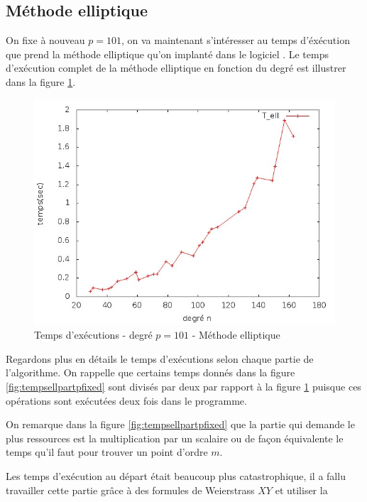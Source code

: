\documentclass[a4paper]{article} %
\numberwithin{section}{part}
\numberwithin{equation}{section}
\begin{document}
\subsection{Méthode elliptique}
On fixe à nouveau $p = 101$, on va maintenant s'intéresser au temps d'éxécution
que prend la méthode elliptique qu'on implanté dans le logiciel .
Le temps d'exécution complet de la méthode elliptique en fonction du degré est
illustrer dans la figure \ref{fig:tempsellfullpfixed}.\par
\begin{figure}[H]
\begin{center}
\includegraphics[scale=0.6]{data_test17_testell2}
\caption{Temps d'exécutions - degré $p = 101$ - Méthode elliptique}
\label{fig:tempsellfullpfixed}
\end{center}
\end{figure}
Regardons plus en détails le temps d'exécutions selon chaque partie de
l'algorithme. On rappelle que certains temps donnés dans la figure
\ref{fig:tempsellpartpfixed} sont divisés par deux par rapport à la figure 
\ref{fig:tempsellfullpfixed} puisque ces opérations sont exécutées deux fois
dans le programme.\par
On remarque dans la figure \ref{fig:tempsellpartpfixed} que la partie qui 
demande le plus ressources est la multiplication par un scalaire ou de façon
équivalente le temps qu'il faut pour trouver un point d'ordre $m$.\par
Les temps d'exécution au départ était beaucoup plus catastrophique, il a fallu
travailler cette partie grâce à des formules de Weierstrass $XY$ et utiliser la
\end{document}
